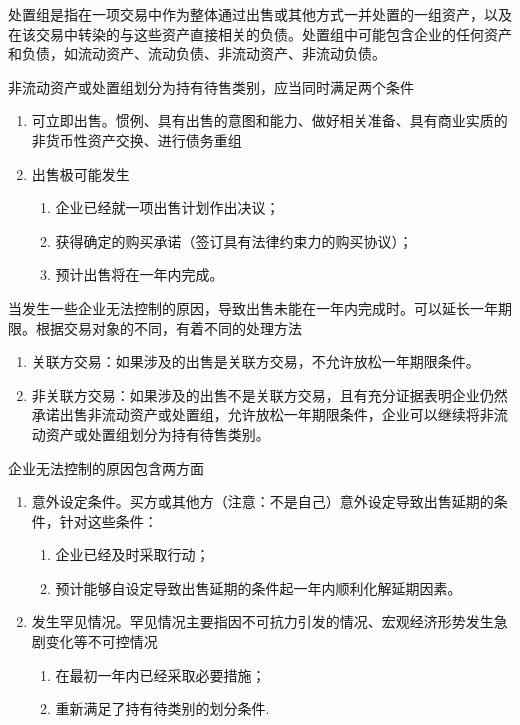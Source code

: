 \documentclass[UTF8,12pt]{ctexart}
\numberwithin{equation}{section} %
\numberwithin{figure}{section}
\numberwithin{table}{section}
\begin{document}
	处置组是指在一项交易中作为整体通过出售或其他方式一并处置的一组资产，以及在该交易中转染的与这些资产直接相关的负债。处置组中可能包含企业的任何资产和负债，如流动资产、流动负债、非流动资产、非流动负债。
	
	非流动资产或处置组划分为持有待售类别，应当同时满足两个条件
	\begin{enumerate}
		\item 可立即出售。惯例、具有出售的意图和能力、做好相关准备、具有商业实质的非货币性资产交换、进行债务重组
		
		\item 出售极可能发生
		\begin{enumerate}
			\item 企业已经就一项出售计划作出决议；
			
			\item 获得确定的购买承诺（签订具有法律约束力的购买协议）；
			
			\item 预计出售将在一年内完成。
		\end{enumerate}
	\end{enumerate}
	
	当发生一些企业无法控制的原因，导致出售未能在一年内完成时。可以延长一年期限。根据交易对象的不同，有着不同的处理方法
	\begin{enumerate}
		\item 关联方交易：如果涉及的出售是关联方交易，不允许放松一年期限条件。
		
		\item 非关联方交易：如果涉及的出售不是关联方交易，且有充分证据表明企业仍然承诺出售非流动资产或处置组，允许放松一年期限条件，企业可以继续将非流动资产或处置组划分为持有待售类别。
	\end{enumerate}

	企业无法控制的原因包含两方面
	\begin{enumerate}
		\item 意外设定条件。买方或其他方（注意：不是自己）意外设定导致出售延期的条件，针对这些条件：
		\begin{enumerate}
			\item 企业已经及时采取行动；

			\item 预计能够自设定导致出售延期的条件起一年内顺利化解延期因素。
		\end{enumerate}
		
		\item 发生罕见情况。罕见情况主要指因不可抗力引发的情况、宏观经济形势发生急剧变化等不可控情况
		\begin{enumerate}
			\item 在最初一年内已经采取必要措施；
			
			\item 重新满足了持有待类别的划分条件.
		\end{enumerate}
	\end{enumerate}
\end{document}
